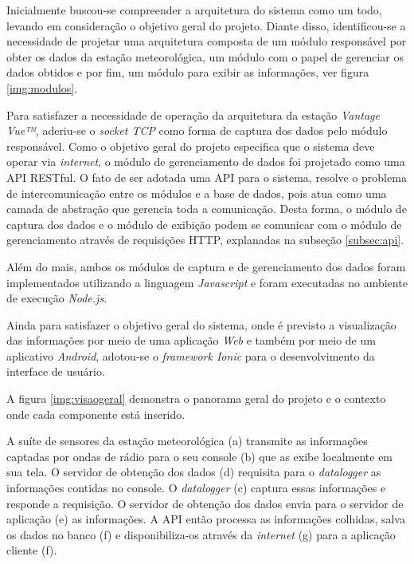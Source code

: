 Inicialmente buscou-se compreender a arquitetura do sistema como um todo, levando em consideração o objetivo geral do projeto. Diante disso, identificou-se a necessidade de projetar uma arquitetura composta de um módulo responsável por obter os dados da estação meteorológica, um módulo com o papel de gerenciar os dados obtidos e por fim, um módulo para exibir as informações, ver figura \ref{img:modulos}.

\newpage
Para satisfazer a necessidade de operação da arquitetura da estação \textit{Vantage Vue™}, aderiu-se o \textit{socket TCP} como forma de captura dos dados pelo módulo responsável. Como o objetivo geral do projeto especifica que o sistema deve operar via \textit{internet}, o módulo de gerenciamento de dados foi projetado como uma API RESTful. O fato de ser adotada uma API para o sistema, resolve o problema de intercomunicação entre os módulos e a base de dados, pois atua como uma camada de abstração que gerencia toda a comunicação. Desta forma, o módulo de captura dos dados e o módulo de exibição podem se comunicar com o módulo de gerenciamento através de requisições HTTP, explanadas na subseção \ref{subsec:api}.

Além do mais, ambos os módulos de captura e de gerenciamento dos dados foram implementados utilizando a linguagem \textit{Javascript} e foram executadas no ambiente de execução \textit{Node.js}.
 
Ainda para satisfazer o objetivo geral do sistema, onde é previsto a visualização das informações por meio de uma aplicação \textit{Web} e também por meio de um aplicativo \textit{Android}, adotou-se o \textit{framework Ionic} para o desenvolvimento da interface de usuário.

A figura \ref{img:visaogeral}  demonstra o panorama geral do projeto e o contexto onde cada componente está inserido.



A suíte de sensores da estação meteorológica (a) transmite as informações captadas por ondas de rádio para o seu console (b) que as exibe localmente em sua tela. O servidor de obtenção dos dados (d) requisita para o \textit{datalogger} as informações contidas no console. O \textit{datalogger} (c) captura essas informações e responde a requisição. O servidor de obtenção dos dados envia para o servidor de aplicação (e) as informações. A API então processa as informações colhidas, salva os dados no banco (f) e disponibiliza-os através da \textit{internet} (g) para a aplicação cliente (f).



